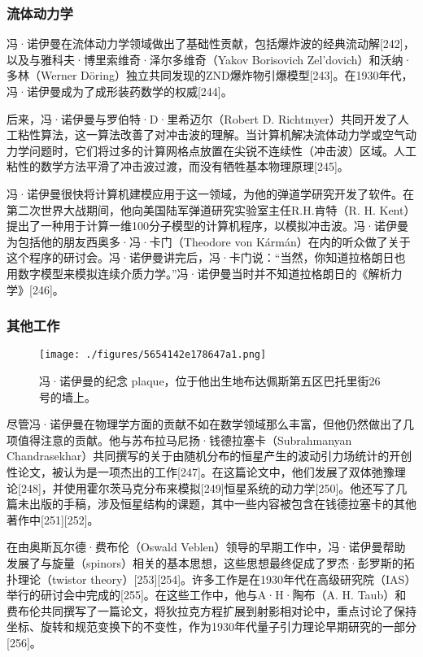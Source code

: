 \subsubsection{流体动力学}  
冯·诺伊曼在流体动力学领域做出了基础性贡献，包括爆炸波的经典流动解[242]，以及与雅科夫·博里索维奇·泽尔多维奇（Yakov Borisovich Zel'dovich）和沃纳·多林（Werner Döring）独立共同发现的ZND爆炸物引爆模型[243]。在1930年代，冯·诺伊曼成为了成形装药数学的权威[244]。

后来，冯·诺伊曼与罗伯特·D·里希迈尔（Robert D. Richtmyer）共同开发了人工粘性算法，这一算法改善了对冲击波的理解。当计算机解决流体动力学或空气动力学问题时，它们将过多的计算网格点放置在尖锐不连续性（冲击波）区域。人工粘性的数学方法平滑了冲击波过渡，而没有牺牲基本物理原理[245]。

冯·诺伊曼很快将计算机建模应用于这一领域，为他的弹道学研究开发了软件。在第二次世界大战期间，他向美国陆军弹道研究实验室主任R.H.肯特（R. H. Kent）提出了一种用于计算一维100分子模型的计算机程序，以模拟冲击波。冯·诺伊曼为包括他的朋友西奥多·冯·卡门（Theodore von Kármán）在内的听众做了关于这个程序的研讨会。冯·诺伊曼讲完后，冯·卡门说：“当然，你知道拉格朗日也用数字模型来模拟连续介质力学。”冯·诺伊曼当时并不知道拉格朗日的《解析力学》[246]。
\subsubsection{其他工作}
\begin{figure}[ht]
\centering
\texttt{[image: ./figures/5654142e178647a1.png]}
\caption{冯·诺伊曼的纪念 plaque，位于他出生地布达佩斯第五区巴托里街26号的墙上。} \label{fig_Neuman_6}
\end{figure}
尽管冯·诺伊曼在物理学方面的贡献不如在数学领域那么丰富，但他仍然做出了几项值得注意的贡献。他与苏布拉马尼扬·钱德拉塞卡（Subrahmanyan Chandrasekhar）共同撰写的关于由随机分布的恒星产生的波动引力场统计的开创性论文，被认为是一项杰出的工作[247]。在这篇论文中，他们发展了双体弛豫理论[248]，并使用霍尔茨马克分布来模拟[249]恒星系统的动力学[250]。他还写了几篇未出版的手稿，涉及恒星结构的课题，其中一些内容被包含在钱德拉塞卡的其他著作中[251][252]。

在由奥斯瓦尔德·费布伦（Oswald Veblen）领导的早期工作中，冯·诺伊曼帮助发展了与旋量（spinors）相关的基本思想，这些思想最终促成了罗杰·彭罗斯的拓扑理论（twistor theory）[253][254]。许多工作是在1930年代在高级研究院（IAS）举行的研讨会中完成的[255]。在这些工作中，他与A·H·陶布（A. H. Taub）和费布伦共同撰写了一篇论文，将狄拉克方程扩展到射影相对论中，重点讨论了保持坐标、旋转和规范变换下的不变性，作为1930年代量子引力理论早期研究的一部分[256]。

